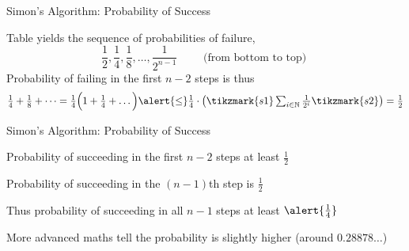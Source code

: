 \documentclass{beamer}
\begin{document}
\begin{frame}{Simon's Algorithm: Probability of Success}
        \begin{center}
        \end{center}

        Table yields the sequence of probabilities of failure,
        \[
                \textstyle{
                        \frac{1}{2}, \frac{1}{4}, \frac{1}{8}, \dots, \frac{1}{2^{n-1}}
                }
                \qquad
                \text{ (from bottom to top) }
        \]
        Probability of failing in the first $n-2$ steps is thus 
        \[
                \textstyle{
                \frac{1}{4} + \frac{1}{8} + \dots = 
                \frac{1}{4} \Big (1 + \frac{1}{4} + \dots \Big ) \alert{\leq}
                \frac{1}{4} \cdot \left ( \tikzmark{s1} \sum_{i \in \mathbb{N}} \frac{1}{2^i}
                \tikzmark{s2} \right )
                = \frac{1}{2}
                }
        \]

\end{frame}

\begin{frame}{Simon's Algorithm: Probability of Success}

       Probability of succeeding in the first $n-2$ steps at least $\frac{1}{2}$

       Probability of succeeding in the $(n-1)$th step is $\frac{1}{2}$

       Thus probability of succeeding in all $n-1$ steps at least $\alert{\frac{1}{4}}$

       \pause
       More advanced maths tell the probability is slightly higher
       (around $0.28878\dots$)
\end{frame}
\end{document}
